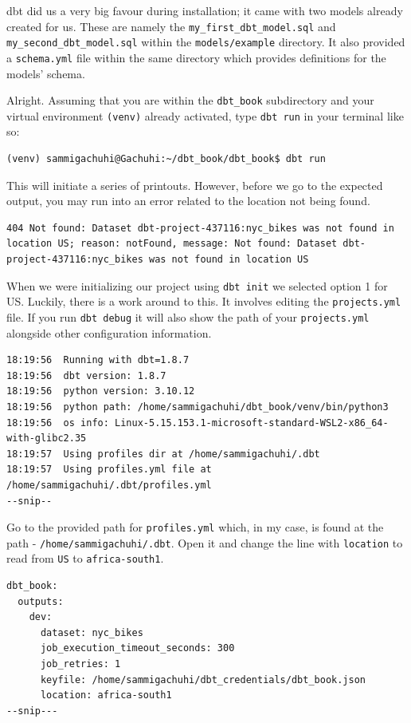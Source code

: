 \documentclass[
]{book}
\begin{document}
dbt did us a very big favour during installation; it came with two models already created for us. These are namely the \texttt{my\_first\_dbt\_model.sql} and \texttt{my\_second\_dbt\_model.sql} within the \texttt{models/example} directory. It also provided a \texttt{schema.yml} file within the same directory which provides definitions for the models' schema.

Alright. Assuming that you are within the \texttt{dbt\_book} subdirectory and your virtual environment \texttt{(venv)} already activated, type \texttt{dbt\ run} in your terminal like so:

\begin{verbatim}
(venv) sammigachuhi@Gachuhi:~/dbt_book/dbt_book$ dbt run
\end{verbatim}

This will initiate a series of printouts. However, before we go to the expected output, you may run into an error related to the location not being found.

\begin{verbatim}
404 Not found: Dataset dbt-project-437116:nyc_bikes was not found in location US; reason: notFound, message: Not found: Dataset dbt-project-437116:nyc_bikes was not found in location US
\end{verbatim}

When we were initializing our project using \texttt{dbt\ init} we selected option 1 for US. Luckily, there is a work around to this. It involves editing the \texttt{projects.yml} file. If you run \texttt{dbt\ debug} it will also show the path of your \texttt{projects.yml} alongside other configuration information.

\begin{verbatim}
18:19:56  Running with dbt=1.8.7
18:19:56  dbt version: 1.8.7
18:19:56  python version: 3.10.12
18:19:56  python path: /home/sammigachuhi/dbt_book/venv/bin/python3
18:19:56  os info: Linux-5.15.153.1-microsoft-standard-WSL2-x86_64-with-glibc2.35
18:19:57  Using profiles dir at /home/sammigachuhi/.dbt
18:19:57  Using profiles.yml file at /home/sammigachuhi/.dbt/profiles.yml
--snip--
\end{verbatim}

Go to the provided path for \texttt{profiles.yml} which, in my case, is found at the path - \texttt{/home/sammigachuhi/.dbt}. Open it and change the line with \texttt{location} to read from \texttt{US} to \texttt{africa-south1}.

\begin{verbatim}
dbt_book:
  outputs:
    dev:
      dataset: nyc_bikes
      job_execution_timeout_seconds: 300
      job_retries: 1
      keyfile: /home/sammigachuhi/dbt_credentials/dbt_book.json
      location: africa-south1 
--snip---
\end{verbatim}
\end{document}
